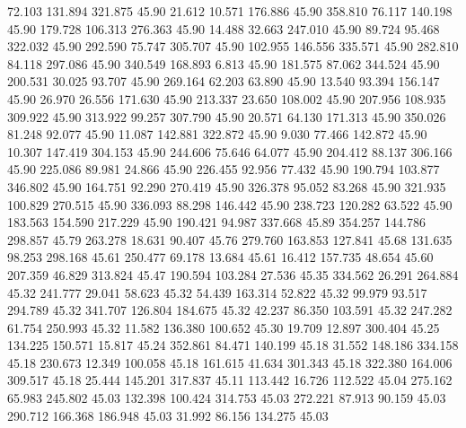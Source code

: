   72.103  131.894  321.875        45.90
  21.612   10.571  176.886        45.90
 358.810   76.117  140.198        45.90
 179.728  106.313  276.363        45.90
  14.488   32.663  247.010        45.90
  89.724   95.468  322.032        45.90
 292.590   75.747  305.707        45.90
 102.955  146.556  335.571        45.90
 282.810   84.118  297.086        45.90
 340.549  168.893    6.813        45.90
 181.575   87.062  344.524        45.90
 200.531   30.025   93.707        45.90
 269.164   62.203   63.890        45.90
  13.540   93.394  156.147        45.90
  26.970   26.556  171.630        45.90
 213.337   23.650  108.002        45.90
 207.956  108.935  309.922        45.90
 313.922   99.257  307.790        45.90
  20.571   64.130  171.313        45.90
 350.026   81.248   92.077        45.90
  11.087  142.881  322.872        45.90
   9.030   77.466  142.872        45.90
  10.307  147.419  304.153        45.90
 244.606   75.646   64.077        45.90
 204.412   88.137  306.166        45.90
 225.086   89.981   24.866        45.90
 226.455   92.956   77.432        45.90
 190.794  103.877  346.802        45.90
 164.751   92.290  270.419        45.90
 326.378   95.052   83.268        45.90
 321.935  100.829  270.515        45.90
 336.093   88.298  146.442        45.90
 238.723  120.282   63.522        45.90
 183.563  154.590  217.229        45.90
 190.421   94.987  337.668        45.89
 354.257  144.786  298.857        45.79
 263.278   18.631   90.407        45.76
 279.760  163.853  127.841        45.68
 131.635   98.253  298.168        45.61
 250.477   69.178   13.684        45.61
  16.412  157.735   48.654        45.60
 207.359   46.829  313.824        45.47
 190.594  103.284   27.536        45.35
 334.562   26.291  264.884        45.32
 241.777   29.041   58.623        45.32
  54.439  163.314   52.822        45.32
  99.979   93.517  294.789        45.32
 341.707  126.804  184.675        45.32
  42.237   86.350  103.591        45.32
 247.282   61.754  250.993        45.32
  11.582  136.380  100.652        45.30
  19.709   12.897  300.404        45.25
 134.225  150.571   15.817        45.24
 352.861   84.471  140.199        45.18
  31.552  148.186  334.158        45.18
 230.673   12.349  100.058        45.18
 161.615   41.634  301.343        45.18
 322.380  164.006  309.517        45.18
  25.444  145.201  317.837        45.11
 113.442   16.726  112.522        45.04
 275.162   65.983  245.802        45.03
 132.398  100.424  314.753        45.03
 272.221   87.913   90.159        45.03
 290.712  166.368  186.948        45.03
  31.992   86.156  134.275        45.03
